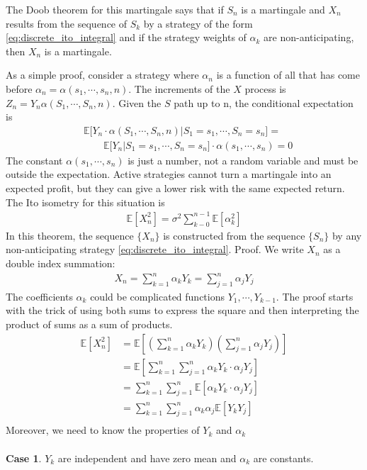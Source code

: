 The Doob theorem for this martingale says that if $S_n$ is a martingale and $X_n$ results from the sequence of $S_k$ by a strategy of the form \eqref{eq:discrete_ito_integral} and if the strategy weights of $\alpha_k$ are non-anticipating, then $X_n$ is a martingale.

As a simple proof, consider a strategy where $\alpha_n$ is a function of all that has come before $\alpha_n=\alpha(s_1, \cdots, s_n, n)$. The increments of the $X$ process is $Z_n=Y_n\alpha(S_1,\cdots,S_n, n)$. Given the $S$ path up to n, the conditional expectation is
\begin{align*}
&\mathbb{E}\big[Y_n\cdot\alpha(S_1,\cdots,S_n, n) | S_1=s_1, \cdots, S_n=s_n\big]  = \\
&\qquad \mathbb{E}\big[ Y_n \big| S_1=s_1,\cdots, S_n=s_n \big] \cdot \alpha(s_1,\cdots,s_n)=0
\end{align*}
The constant $\alpha (s_1,\cdots, s_n)$ is just a number, not a random variable and must be outside  the expectation. Active strategies cannot turn a martingale into an expected profit, but they can give a lower risk with the same expected return. The Ito isometry for this situation is 
\begin{align}\label{eq:ito_isometry}
\mathbb{E}[X_n^2] = \sigma^2 \sum_{k-0}^{n-1} \mathbb{E}[\alpha_k^2]
\end{align}
In this theorem, the sequence $\{X_n\}$ is constructed from the sequence $\{S_n\}$ by any non-anticipating strategy \eqref{eq:discrete_ito_integral}.
Proof. We write $X_n$ as a double index summation:
\begin{align*}
X_n=\sum_{k=1}^n \alpha_kY_k  = \sum_{j=1}^n \alpha_jY_j 
\end{align*}
The coefficients $\alpha_k$ could be complicated functions $Y_1, \cdots, Y_{k-1}$.  The proof starts with the trick of using both sums to express the square and then interpreting the product of sums as a sum of products.
\begin{align*}
\mathbb{E}[X_n^2] &= \mathbb{E}\left[\left(\sum_{k=1}^n \alpha_kY_k\right)\left(\sum_{j=1}^n \alpha_jY_j\right)\right]\\
&= \mathbb{E}\left[\sum_{k=1}^n\sum_{j=1}^n \alpha_kY_k\cdot\alpha_jY_j\right] \\
&= \sum_{k=1}^n\sum_{j=1}^n \mathbb{E}\left[\alpha_kY_k\cdot\alpha_jY_j \right]\\
&= \sum_{k=1}^n\sum_{j=1}^n \alpha_k \alpha_j\mathbb{E}\left[Y_k
Y_j \right]\\
\end{align*}
Moreover, we need to know the properties of $Y_k$ and $\alpha_k$
\\
\\
\textbf{Case 1}. $Y_k$ are independent and have zero mean and $\alpha_k$ are constants.

